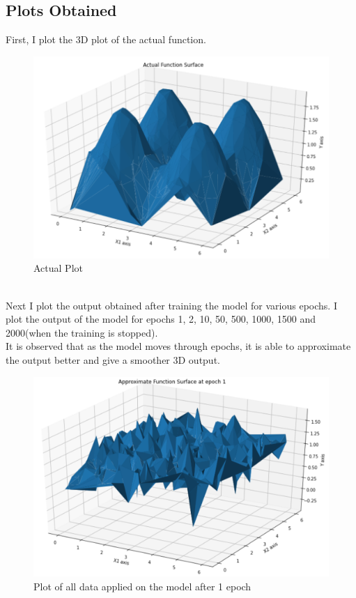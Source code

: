 \documentclass[10pt,a4paper]{article}
\begin{document}
\subsection{Plots Obtained}
First, I plot the 3D plot of the actual function.
\begin{figure}[htbp]
    \centering
    \includegraphics[width=0.8\linewidth]{ActualFunc.png}
    \captionsetup{justification=centering}
    \caption{Actual Plot}
\end{figure}
\\Next I plot the output obtained after training the model for various epochs. I plot the output of the model for epochs 1, 2, 10, 50, 500, 1000, 1500 and 2000(when the training is stopped).\\
It is observed that as the model moves through epochs, it is able to approximate the output better and give a smoother 3D output.
\begin{figure}[htbp]
    \centering
    \includegraphics[width=0.8\linewidth]{Ep1.png}
    \captionsetup{justification=centering}
    \caption{Plot of all data applied on the model after 1 epoch}
\end{figure}
\end{document}

